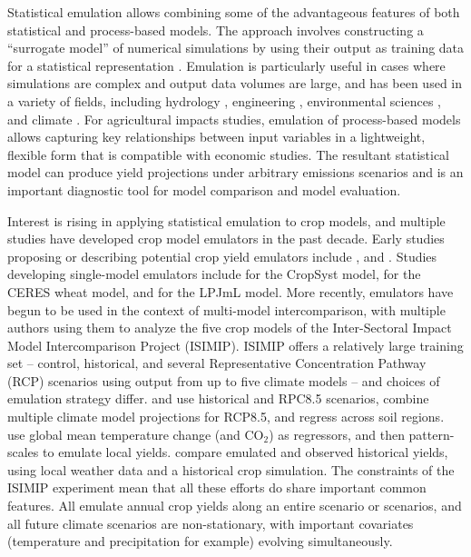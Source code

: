 \documentclass[gmdd]{copernicus} %
\begin{document}
Statistical emulation allows combining some of the advantageous features of both statistical and process-based models.
The approach involves constructing a ``surrogate model'' of numerical simulations by using their output as training data for a statistical representation \citep[e.g.][]{OHAGAN2006, OHAGAN2010}. 
Emulation is particularly useful in cases where simulations are complex and output data volumes are large, and has been used in a variety of fields, including hydrology \citep[e.g.][]{Razavi2012}, engineering \citep[e.g.][]{STORLIE2009}, environmental sciences \citep[e.g.][]{RATTO2012}, and climate \citep[e.g.][]{Castruccio14, Holden2014}. 
For agricultural impacts studies, emulation of process-based models allows capturing key relationships between input variables in a lightweight, flexible form that is compatible with economic studies. 
The resultant statistical model can produce yield projections under arbitrary emissions scenarios and is an important diagnostic tool for model comparison and model evaluation.

Interest is rising in applying statistical emulation to crop models, and multiple studies have developed crop model emulators in the past decade.
Early studies proposing or describing potential crop yield emulators include \citet{Howden2005, raisen2006, Lobell2010}, and \citet{Ferrise2011}.
Studies developing single-model emulators include \citet{Holzkamper2012} for the CropSyst model, \citet{RUANE2013a} for the CERES wheat model, and \citet{Oyebamiji15} for the LPJmL model. 
More recently, emulators have begun to be used in the context of multi-model intercomparison, with multiple authors \citep{BLANC2015, BLANC2017, Ostberg2018, Mistry2017}  using them to analyze the five crop models  of the Inter-Sectoral Impact Model Intercomparison Project (ISIMIP). ISIMIP offers a relatively large training set --  control, historical, and several Representative Concentration Pathway (RCP) scenarios using output from up to five climate models \citep{Warszawski3228, Frieler2017} -- and choices of emulation strategy differ.
\citet{BLANC2015} and \citet{BLANC2017} use historical and RPC8.5 scenarios, combine multiple climate model projections for RCP8.5, and regress across soil regions. 
\citet{Ostberg2018} use global mean temperature change (and CO$_2$) as regressors, and then pattern-scales to emulate local yields. 
\citet{Mistry2017} compare emulated and observed historical yields, using local weather data and a historical crop simulation. 
The constraints of the ISIMIP experiment mean that all these efforts do share important common features. 
All emulate annual crop yields along an entire scenario or scenarios, and all future climate scenarios are non-stationary, with important covariates (temperature and precipitation for example) evolving simultaneously. 
\end{document}
